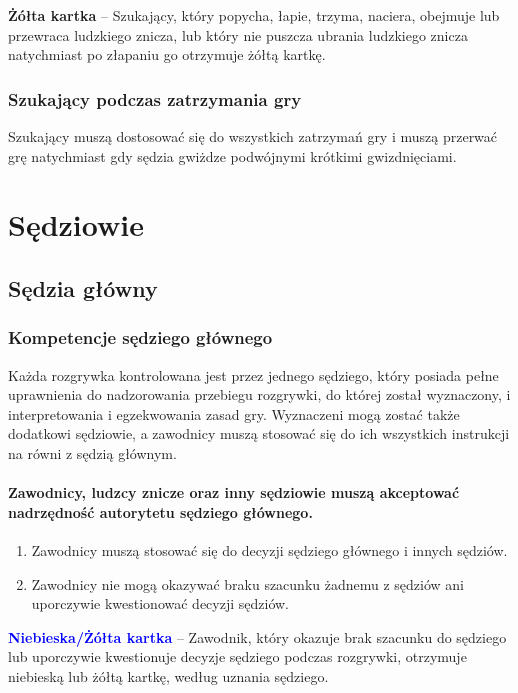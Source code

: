 \documentclass[12pt]{article}
\newcommand\yellowcard[1]{\bgroup\textcolor{darkyellow}{\textbf{#1}}}
\newcommand\bluecard[1]{\bgroup\textcolor{blue}{\textbf{#1}}}
\begin{document}
\yellowcard{Żółta kartka} -- Szukający, który popycha, łapie, trzyma, naciera,
obejmuje lub przewraca ludzkiego znicza, lub który nie puszcza ubrania
ludzkiego znicza natychmiast po złapaniu go otrzymuje żółtą kartkę.

\subsubsection{Szukający podczas zatrzymania gry}

Szukający muszą dostosować się do wszystkich zatrzymań gry i muszą
przerwać grę natychmiast gdy sędzia gwiżdze podwójnymi krótkimi
gwizdnięciami.

\pagebreak
\section{Sędziowie}

\subsection{Sędzia główny}

\subsubsection{Kompetencje sędziego głównego}

Każda rozgrywka kontrolowana jest przez jednego sędziego, który posiada
pełne uprawnienia do nadzorowania przebiegu rozgrywki, do której został
wyznaczony, i interpretowania i egzekwowania zasad gry. Wyznaczeni mogą
zostać także dodatkowi sędziowie, a zawodnicy muszą stosować się do ich
wszystkich instrukcji na równi z sędzią głównym.

\paragraph{Zawodnicy, ludzcy znicze oraz inny sędziowie muszą
	akceptować nadrzędność autorytetu sędziego głównego.}

\begin{enumerate}
	\item
	      Zawodnicy muszą stosować się do decyzji sędziego głównego i innych
	      sędziów.
	\item
	      Zawodnicy nie mogą okazywać braku szacunku żadnemu z sędziów ani
	      uporczywie kwestionować decyzji sędziów.
\end{enumerate}

\bluecard{Niebieska/Żółta kartka} -- Zawodnik, który okazuje brak szacunku do
sędziego lub uporczywie kwestionuje decyzje sędziego podczas rozgrywki,
otrzymuje niebieską lub żółtą kartkę, według uznania sędziego.
\end{document}
